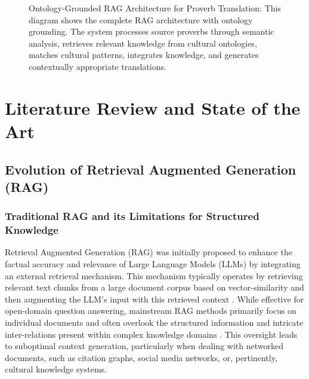 \documentclass[12pt]{article}
\let\cite\textcite  %
\begin{document}
\begin{figure}[htbp]
\caption{Ontology-Grounded RAG Architecture for Proverb Translation: This diagram shows the complete RAG architecture with ontology grounding. The system processes source proverbs through semantic analysis, retrieves relevant knowledge from cultural ontologies, matches cultural patterns, integrates knowledge, and generates contextually appropriate translations.}
\label{fig:rag_architecture}
\end{figure}

\section{Literature Review and State of the Art}

\subsection{Evolution of Retrieval Augmented Generation (RAG)}

\subsubsection{Traditional RAG and its Limitations for Structured Knowledge}

Retrieval Augmented Generation (RAG) was initially proposed to enhance the factual accuracy and relevance of Large Language Models (LLMs) by integrating an external retrieval mechanism. This mechanism typically operates by retrieving relevant text chunks from a large document corpus based on vector-similarity and then augmenting the LLM's input with this retrieved context \cite{googleai2023rag, datacamp2024kg}. While effective for open-domain question answering, mainstream RAG methods primarily focus on individual documents and often overlook the structured information and intricate inter-relations present within complex knowledge domains \cite{googleai2023rag, chen2024og}. This oversight leads to suboptimal context generation, particularly when dealing with networked documents, such as citation graphs, social media networks, or, pertinently, cultural knowledge systems.
\end{document}
